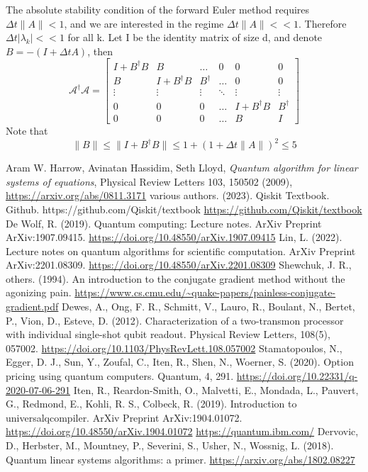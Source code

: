 \documentclass[12pt, oneside]{book}
\theoremstyle{definition}
\theoremstyle{definition}
\theoremstyle{remark}
\begin{document}
The absolute stability condition of the forward Euler method requires $\Delta t\|A\|<1$, and we are interested in the regime $\Delta t\|A\|<<1$. Therefore $\Delta t|\lambda_k|<<1$ for all k. Let I be the identity matrix of size d, and denote $B=-(I+\Delta tA)$, then
\[
\mathcal{A}^{\dagger}\mathcal{A}=\begin{bmatrix} I + B^{\dagger}B & B & \ldots & 0 & 0 & 0 \\ B & I + B^{\dagger}B & B^{\dagger} & \ldots & 0 & 0 \\
\vdots & \vdots & \vdots & \ddots &\vdots & \vdots  \\
0 & 0 & 0 & \ldots & I+B^{\dagger}B & B^{\dagger} \\
0 & 0 & 0 & \ldots & B & I \end{bmatrix}
\]
Note that
\[
\|B\|\leq \|I+B^{\dagger}B\|\leq 1+(1+\Delta t\|A\|)^2\leq 5
\]


\begin{thebibliography}{9}
    Aram W. Harrow, Avinatan Hassidim, Seth Lloyd,
    \textit{Quantum algorithm for linear systems of equations},
    Physical Review Letters 103, 150502 (2009),
    \url{https://arxiv.org/abs/0811.3171}
    various authors. (2023). Qiskit Textbook. Github. https://github.com/Qiskit/textbook
    \url{https://github.com/Qiskit/textbook}
    De Wolf, R. (2019). Quantum computing: Lecture notes. ArXiv Preprint ArXiv:1907.09415.
    \url{https://doi.org/10.48550/arXiv.1907.09415}
    Lin, L. (2022). Lecture notes on quantum algorithms for scientific computation. ArXiv Preprint ArXiv:2201.08309.
    \url{https://doi.org/10.48550/arXiv.2201.08309}
    Shewchuk, J. R.,  others. (1994). An introduction to the conjugate gradient method without the agonizing pain.
    \url{https://www.cs.cmu.edu/~quake-papers/painless-conjugate-gradient.pdf}
    Dewes, A., Ong, F. R., Schmitt, V., Lauro, R., Boulant, N., Bertet, P., Vion, D.,  Esteve, D. (2012). Characterization of a two-transmon processor with individual single-shot qubit readout. Physical Review Letters, 108(5), 057002.
    \url{https://doi.org/10.1103/PhysRevLett.108.057002}
    Stamatopoulos, N., Egger, D. J., Sun, Y., Zoufal, C., Iten, R., Shen, N.,  Woerner, S. (2020). Option pricing using quantum computers. Quantum, 4, 291.
    \url{https://doi.org/10.22331/q-2020-07-06-291}
    Iten, R., Reardon-Smith, O., Malvetti, E., Mondada, L., Pauvert, G., Redmond, E., Kohli, R. S., Colbeck, R. (2019). Introduction to universalqcompiler. ArXiv Preprint ArXiv:1904.01072.
    \url{https://doi.org/10.48550/arXiv.1904.01072}
    \bibitem{}
    \url{https://quantum.ibm.com/}
    Dervovic, D., Herbster, M., Mountney, P., Severini, S., Usher, N., Wossnig, L. (2018). Quantum linear systems algorithms: a primer. \url{https://arxiv.org/abs/1802.08227}
\end{thebibliography}
\end{document}
